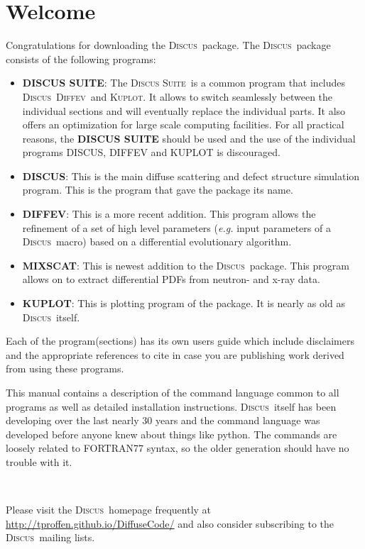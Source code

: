 \documentclass[11pt]{report}
\newcommand{\Discus}{\textsc{Discus\ }}
\newcommand{\Diffev}{\textsc{Diffev\ }}
\newcommand{\kuplot}{\textsc{Kuplot}}
\newcommand{\Suite}{\textsc{Discus Suite\ }}
\begin{document}
\newpage
\chapter{Welcome} \label{welc}

Congratulations for downloading the \Discus package. The \Discus package
consists of the following programs:

\begin{itemize}
  \item \textbf{\textsc{DISCUS SUITE}}: The \Suite is a common program
  that includes \Discus \Diffev and \kuplot. It allows to switch
  seamlessly between the individual sections and will eventually replace
  the individual parts. It also offers an optimization for large scale 
  computing facilities. For all practical reasons, the 
  \textbf{\textsc{DISCUS SUITE}} should be used and the use of the 
  individual programs DISCUS, DIFFEV and KUPLOT is discouraged.

  \item \textbf{\textsc{DISCUS}}: This is the main diffuse scattering
  and defect structure simulation program. This is the program that
  gave the package its name.
  
  \item \textbf{\textsc{DIFFEV}}: This is a more recent addition. This
  program allows the refinement of a set of high level parameters 
  (\textit{e.g.} input parameters of a \Discus macro) based on a
  differential evolutionary algorithm.
  
  \item \textbf{\textsc{MIXSCAT}}: This is newest addition to the 
  \Discus package. This program allows on to extract differential
  PDFs from neutron- and x-ray data.
  
  \item \textbf{\textsc{KUPLOT}}: This is plotting program of the
  package. It is nearly as old as \Discus itself. 
  
\end{itemize}

Each of the program(sections) has its own users guide which include disclaimers 
and the appropriate references to cite in case you are publishing work
derived from using these programs.

This manual contains a description of the command language common to all
programs as well as detailed installation instructions. \Discus itself 
has been developing over the last nearly 30 years and the command language
was developed before anyone knew about things like python. The commands
are loosely related to FORTRAN77 syntax, so the older generation should
have no trouble with it. 
\par
\ \par
Please visit the \Discus homepage frequently at 
\url{http://tproffen.github.io/DiffuseCode/} 
and also consider subscribing 
to the \Discus mailing lists.
\end{document}
